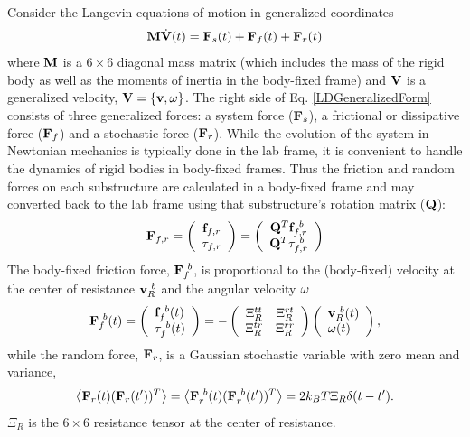\documentclass[]{book}
\begin{document}
Consider the Langevin equations of motion in generalized coordinates
\begin{equation}
{\bf M} \dot{{\bf V}}(t) = {\bf F}_{s}(t) +
{\bf F}_{f}(t)  + {\bf F}_{r}(t) 
\label{LDGeneralizedForm}
\end{equation}
where ${\bf M}$ is a $6 \times 6$ diagonal mass matrix (which
includes the mass of the rigid body as well as the moments of inertia
in the body-fixed frame) and ${\bf V}$ is a generalized velocity,
${\bf V} =
\left\{{\bf v},{\bf \omega}\right\}$. The right side of
Eq. \ref{LDGeneralizedForm} consists of three generalized forces: a
system force (${\bf F}_{s}$), a frictional or dissipative force (${\bf
F}_{f}$) and a stochastic force (${\bf F}_{r}$). While the evolution
of the system in Newtonian mechanics is typically done in the lab
frame, it is convenient to handle the dynamics of rigid bodies in
body-fixed frames. Thus the friction and random forces on each
substructure are calculated in a body-fixed frame and may converted
back to the lab frame using that substructure's rotation matrix (${\bf
Q}$):
\begin{equation}
{\bf F}_{f,r} = 
\left( \begin{array}{c}
{\bf f}_{f,r} \\
{\bf \tau}_{f,r}
\end{array} \right)
=
\left( \begin{array}{c}
{\bf Q}^{T} {\bf f}^{~b}_{f,r} \\
{\bf Q}^{T} {\bf \tau}^{~b}_{f,r}
\end{array} \right)
\end{equation}
The body-fixed friction force, ${\bf F}_{f}^{~b}$, is proportional to
the (body-fixed) velocity at the center of resistance
${\bf v}_{R}^{~b}$ and the angular velocity ${\bf \omega}$
\begin{equation}
{\bf F}_{f}^{~b}(t) = \left( \begin{array}{l}
 {\bf f}_{f}^{~b}(t) \\
 {\bf \tau}_{f}^{~b}(t) \\
 \end{array} \right) =  - \left( \begin{array}{*{20}c}
   \Xi_{R}^{tt} & \Xi_{R}^{rt} \\
   \Xi_{R}^{tr} & \Xi_{R}^{rr}    \\
\end{array} \right)\left( \begin{array}{l}
 {\bf v}_{R}^{~b}(t) \\
 {\bf \omega}(t) \\
 \end{array} \right),
\end{equation}
while the random force, ${\bf F}_{r}$, is a Gaussian stochastic
variable with zero mean and variance,
\begin{equation}
\left\langle {{\bf F}_{r}(t) ({\bf F}_{r}(t'))^T } \right\rangle  =
\left\langle {{\bf F}_{r}^{~b} (t) ({\bf F}_{r}^{~b} (t'))^T } \right\rangle  =
2 k_B T \Xi_R \delta(t - t'). \label{eq:randomForce}
\end{equation}
$\Xi_R$ is the $6\times6$ resistance tensor at the center of
resistance.  
\end{document}
